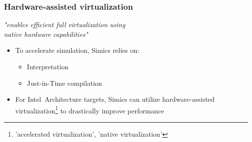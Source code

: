 \begin{frame}
\frametitle{Hardware-assisted virtualization}

\begin{center}
  \textit{"enables efficient full virtualization using\\
    native hardware capabilities"}
\end{center}

\begin{itemize}
\item To accelerate simulation, Simics relies on:
  \begin{itemize}
  \item Interpretation
  \item Just-in-Time compilation
  \end{itemize}
\item For Intel\circledR\ Architecture targets, Simics can utilize hardware-assisted virtualization\footnote{'accelerated virtualization', 'native virtualization'} to drastically improve performance
\end{itemize}

\end{frame}
